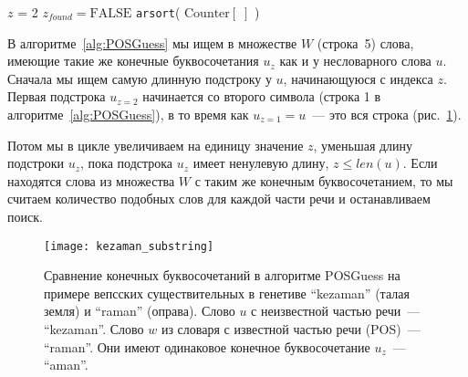 \begin{algorithm}
    $z$ = 2 
    $z_{found} = \text{FALSE}$ \;
    \BlankLine
    \BlankLine
    \verb|arsort|( $\text{Counter} \left[ \; \right]$ )
\end{algorithm}


В алгоритме~\ref{alg:POSGuess} мы ищем в множестве $W$ (строка~5) слова, имеющие такие же конечные буквосочетания $u_z$ как и  у несловарного слова $u$. 
Сначала мы ищем самую длинную подстроку у $u$, начинающуюся с индекса $z$. 
Первая подстрока $u_{z=2}$ начинается со второго символа (строка 1 в алгоритме~\ref{alg:POSGuess}), в то время как $u_{z=1} = u$~--- это вся строка (рис.~\ref{fig:kezaman_substring}). 

Потом мы в цикле увеличиваем на единицу значение $z$, уменьшая длину подстроки $u_z$, 
пока подстрока $u_z$ имеет ненулевую длину, $z \leq len(u)$.
Если находятся слова из множества $W$ с таким же конечным буквосочетанием, то мы считаем количество подобных слов для каждой части речи и останавливаем поиск.

\begin{figure}
    \centering
	\texttt{[image: kezaman\_substring]}
	\caption[Сравнение конечных буквосочетаний в алгоритме POSGuess]{Сравнение 
конечных буквосочетаний в алгоритме POSGuess на примере 
вепсских существительных в генетиве ``kezaman'' (талая земля) и ``raman'' (оправа). 
	Слово $u$ 
	с неизвестной частью речи~--- ``kezaman''. 
	Слово $w$ из словаря с известной частью речи (POS)~--- ``raman''. 
	Они имеют одинаковое конечное буквосочетание $u_z$~--- ``aman''.} 
	\label{fig:kezaman_substring}
\end{figure}

